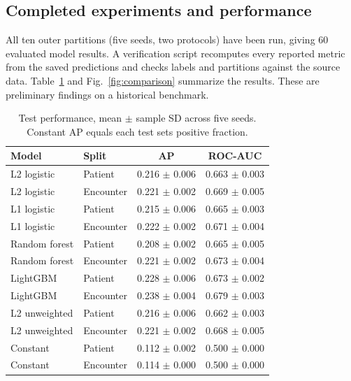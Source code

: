 \subsection{Completed experiments and performance}

All ten outer partitions (five seeds, two protocols) have been run, giving 60 evaluated model results. A verification script recomputes every reported metric from the saved predictions and checks labels and partitions against the source data. Table~\ref{tab:performance} and Fig.~\ref{fig:comparison} summarize the results. These are preliminary findings on a historical benchmark.

\begin{table}[t]\caption{Test performance, mean $\pm$ sample SD across five seeds. Constant AP equals each test set\textquotesingle s positive fraction.}\label{tab:performance}\centering\footnotesize\begin{tabular}{llcc}\toprule Model & Split & AP & ROC-AUC\\\midrule

L2 logistic & Patient & 0.216 $\pm$ 0.006 & 0.663 $\pm$ 0.003 \\

L2 logistic & Encounter & 0.221 $\pm$ 0.002 & 0.669 $\pm$ 0.005 \\

L1 logistic & Patient & 0.215 $\pm$ 0.006 & 0.665 $\pm$ 0.003 \\

L1 logistic & Encounter & 0.222 $\pm$ 0.002 & 0.671 $\pm$ 0.004 \\

Random forest & Patient & 0.208 $\pm$ 0.002 & 0.665 $\pm$ 0.005 \\

Random forest & Encounter & 0.221 $\pm$ 0.002 & 0.673 $\pm$ 0.004 \\

LightGBM & Patient & 0.228 $\pm$ 0.006 & 0.673 $\pm$ 0.002 \\

LightGBM & Encounter & 0.238 $\pm$ 0.004 & 0.679 $\pm$ 0.003 \\

L2 unweighted & Patient & 0.216 $\pm$ 0.006 & 0.662 $\pm$ 0.003 \\

L2 unweighted & Encounter & 0.221 $\pm$ 0.002 & 0.668 $\pm$ 0.005 \\

Constant & Patient & 0.112 $\pm$ 0.002 & 0.500 $\pm$ 0.000 \\

Constant & Encounter & 0.114 $\pm$ 0.000 & 0.500 $\pm$ 0.000 \\

\bottomrule\end{tabular}\end{table}

